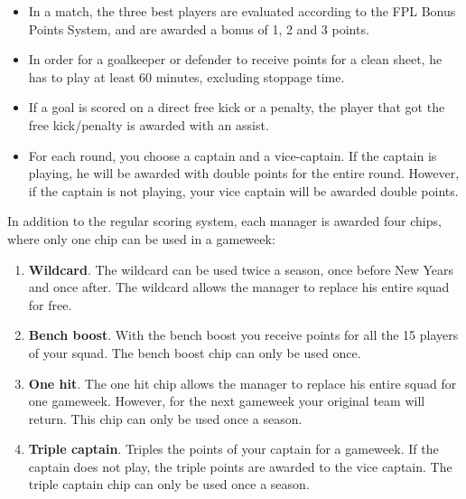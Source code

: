 \begin{itemize}
    \item In a match, the three best players are evaluated according to the FPL Bonus Points System, and are awarded a bonus of 1, 2 and 3 points. 
    \item In order for a goalkeeper or defender to receive points for a clean sheet, he has to play at least 60 minutes, excluding stoppage time. 
    \item If a goal is scored on a direct free kick or a penalty, the player that got the free kick/penalty is awarded with an assist. 
    \item For each round, you choose a captain and a vice-captain. If the captain is playing, he will be awarded with double points for the entire round. However, if the captain is not playing, your vice captain will be awarded double points. 
\end{itemize}
In addition to the regular scoring system, each manager is awarded four chips, where only one chip can be used in a gameweek: 
\begin{enumerate} [label=(\roman*)]

\item \textbf{Wildcard}. The wildcard can be used twice a season, once before New Years and once after. The wildcard allows the manager to replace his entire squad for free.

\item \textbf{Bench boost}. With the bench boost you receive points for all the 15 players of your squad. The bench boost chip can only be used once. 

\item \textbf{One hit}. The one hit chip allows the manager to replace his entire squad for one gameweek. However, for the next gameweek your original team will return.  This chip can only be used once a season. 

\item \textbf{Triple captain}. Triples the points of your captain for a gameweek. If the captain does not play, the triple points are awarded to the vice captain. The triple captain chip can only be used once a season. 
\end{enumerate}
